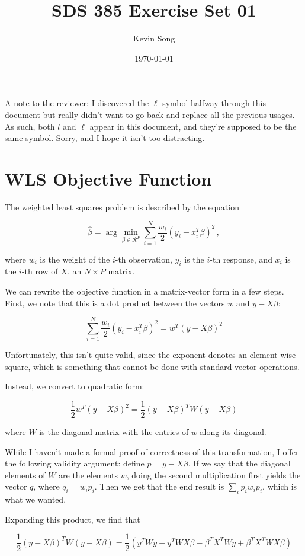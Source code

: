 \documentclass{article}
\title{SDS 385 Exercise Set 01}
\author{Kevin Song}
\date{\today}
\begin{document}
\maketitle

A note to the reviewer: I discovered the $\ell$ symbol halfway through this
document but really didn't want to go back and replace all the previous usages.
As such, both $l$ and $\ell$ appear in this document, and they're supposed to be
the same symbol. Sorry, and I hope it isn't too distracting.

\section{WLS Objective Function}

The weighted least squares problem is described by the equation

\[
\hat{\beta} = \arg \min_{\beta \in \mathcal{R}^P} \sum_{i=1}^N \frac{w_i}{2}(y_i
- x_i^T \beta)^2 \, ,
\]

where $w_i$ is the weight of the $i$-th observation, $y_i$ is the $i$-th
response, and $x_i$ is the $i$-th row of $X$, an $N \times P$ matrix.

We can rewrite the objective function in a matrix-vector form in a few steps. First, we note that
this is a dot product between the vectors $w$ and $y - X\beta$:

\[
 \sum_{i=1}^N \frac{w_i}{2}(y_i - x_i^T \beta)^2 = w^T (y - X\beta)^2
\]

Unfortunately, this isn't quite valid, since the exponent denotes an
element-wise square, which is something that cannot be done with standard vector
operations.

Instead, we convert to quadratic form:

\[
\frac{1}{2} w^T (y - X\beta)^2 =\frac{1}{2} (y - X\beta)^T W (y - X\beta)
\]

where $W$ is the diagonal matrix with the entries of $w$ along its diagonal.

While I haven't made a formal proof of correctness of this transformation, I
offer the following validity argument: define $p = y - X\beta$. If we say that
the diagonal elements of $W$ are the elements $w$, doing the second multiplication
first yields the vector $q$, where $q_i = w_ip_i$. Then we get that the end
result is $\sum_i p_i w_i p_i$, which is what we wanted.

Expanding this product, we find that

\[
  \frac{1}{2} (y - X\beta)^T W (y - X\beta) =
  \frac{1}{2} \left( y^TWy - y^TWX\beta - \beta^TX^TWy + \beta^TX^TWX\beta \right)
\]
\end{document}
